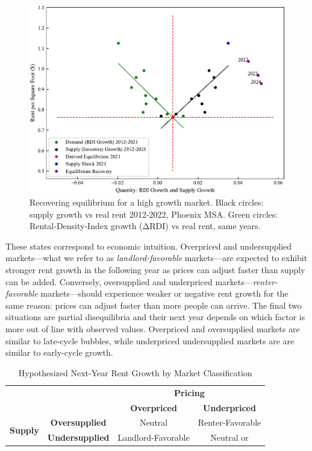 \documentclass[APA,Times1COL]{WileyNJDv5} %
\begin{document}
\begin{figure}[htb!]
	\centering
	\includegraphics[width=0.95\linewidth]{phoenix_example.pdf}
	\caption{Recovering equilibrium for a high growth market.  
		Black circles: supply growth vs real rent 2012‑2022, Phoenix MSA.  
		Green circles: Rental‑Density‑Index growth (ΔRDI) vs real rent, same years.  
}
	\label{fig:phoenix_mechanism}
\end{figure}


These states correspond to economic intuition. Overpriced and undersupplied markets---what we refer to as \textit{landlord-favorable} markets---are expected to exhibit stronger rent growth in the following year as prices can adjust faster than supply can be added. Conversely, oversupplied and underpriced markets---\textit{renter-favorable} markets---should experience weaker or negative rent growth for the same reason: prices can adjust faster than more people can arrive. The final two situations are partial disequilibria and their next year depends on which factor is more out of line with observed values. Overpriced and oversupplied markets are similar to late-cycle bubbles, while underpriced undersupplied markets are are similar to early-cycle growth. 

\begin{table}[h!]
	\centering
	\caption{Hypothesized Next-Year Rent Growth by Market Classification}
	\begin{tabular}{cc|c|c|}
		\multicolumn{2}{c}{} & \multicolumn{2}{c}{\textbf{Pricing}} \\
		\multicolumn{2}{c}{} & \textbf{Overpriced} & \textbf{Underpriced} \\
		\cmidrule{3-4}
		\multirow{2}{*}{\textbf{Supply}} & \textbf{Oversupplied} & Neutral  & Renter-Favorable \\
		\cmidrule{2-4}
		& \textbf{Undersupplied} & Landlord-Favorable & Neutral or \\
		\bottomrule
	\end{tabular}
\end{table}
\end{document}
